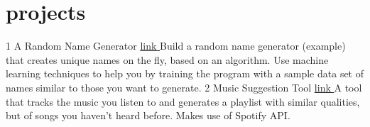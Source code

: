 \section{projects}

\begin{entrylist}
\entry
{1}
{A Random Name Generator}
{{\href{https://github.com/}{link \faGithub}}}
{Build a random name generator (example) that creates unique names on the fly, based on an algorithm. Use machine learning techniques to help you by training the program with a sample data set of names similar to those you want to generate.}
\entry
{2}
{Music Suggestion Tool}
{{\href{https://github.com/}{link \faGithub}}}
{A tool that tracks the music you listen to and generates a playlist with similar qualities, but of songs you haven’t heard before. Makes use of Spotify API.}
\end{entrylist}\vspace{-5mm}